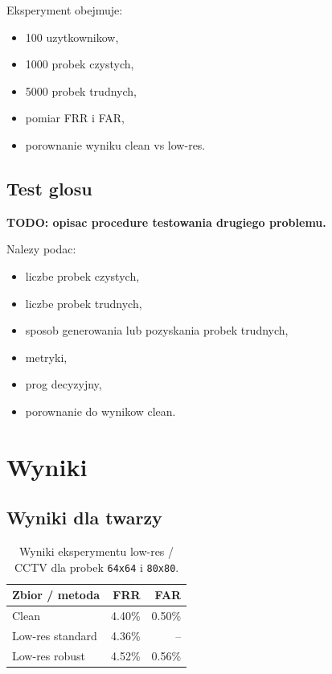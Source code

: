 \documentclass[12pt]{article}
\begin{document}
Eksperyment obejmuje:

\begin{itemize}
    \item 100 uzytkownikow,
    \item 1000 probek czystych,
    \item 5000 probek trudnych,
    \item pomiar FRR i FAR,
    \item porownanie wyniku clean vs low-res.
\end{itemize}

\subsection{Test glosu}

\textbf{TODO: opisac procedure testowania drugiego problemu.}

Nalezy podac:

\begin{itemize}
    \item liczbe probek czystych,
    \item liczbe probek trudnych,
    \item sposob generowania lub pozyskania probek trudnych,
    \item metryki,
    \item prog decyzyjny,
    \item porownanie do wynikow clean.
\end{itemize}

\section{Wyniki}

\subsection{Wyniki dla twarzy}

\begin{table}[ht]
    \centering
    \begin{tabular}{lrr}
        \toprule
        Zbior / metoda & FRR & FAR \\
        \midrule
        Clean & 4.40\% & 0.50\% \\
        Low-res standard & 4.36\% & -- \\
        Low-res robust & 4.52\% & 0.56\% \\
        \bottomrule
    \end{tabular}
    \caption{Wyniki eksperymentu low-res / CCTV dla probek \texttt{64x64} i \texttt{80x80}.}
    \label{tab:face_low_res_results}
\end{table}
\end{document}
